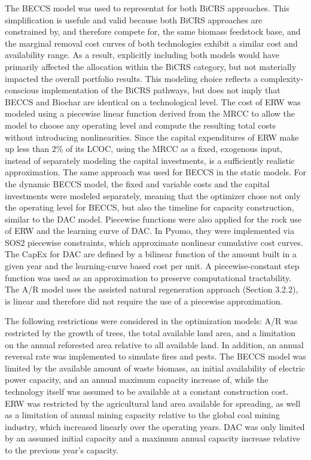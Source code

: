 The BECCS model was used to representat for both BiCRS approaches. This simplification is usefule and valid because both BiCRS approaches are constrained by, and therefore compete for, the same biomass feedstock base, and the marginal removal cost curves of both technologies exhibit a similar cost and availability range. As a result, explicitly including both models would have primarily affected the allocation within the BiCRS category, but not materially impacted the overall portfolio results. This modeling choice reflects a complexity-conscious implementation of the BiCRS pathways, but does not imply that BECCS and Biochar are identical on a technological level. The cost of ERW was modeled using a piecewise linear function derived from the MRCC to allow the model to choose any operating level and compute the resulting total costs without introducing nonlinearities. Since the capital expenditures of ERW make up less than 2\% of its LCOC, using the MRCC as a fixed, exogenous input, instead of separately modeling the capital investments, is a sufficiently realistic approximation. The same approach was used for BECCS in the static models. For the dynamic BECCS model, the fixed and variable costs and the capital investments were modeled separately, meaning that the optimizer chose not only the operating level for BECCS, but also the timeline for capacity construction, similar to the DAC model. Piecewise functions were also applied for the rock use of ERW and the learning curve of DAC. In Pyomo, they were implemented via SOS2 piecewise constraints, which approximate nonlinear cumulative cost curves. The CapEx for DAC are defined by a bilinear function of the amount built in a given year and the learning-curve based cost per unit. A piecewise-constant step function was used as an approximation to preserve computational tractability. The A/R model uses the assisted natural regeneration approach (Section 3.2.2), is linear and therefore did not require the use of a piecewise approximation. \vspace{2mm}

The following restrictions were considered in the optimization models: A/R was restricted by the growth of trees, the total available land area, and a limitation on the annual reforested area relative to all available land. In addition, an annual reversal rate was implemented to simulate fires and pests. The BECCS model was limited by the available amount of waste biomass, an initial availability of electric power capacity, and an annual maximum capacity increase of, while the technology itself was assumed to be available at a constant construction cost. ERW was restricted by the agricultural land area available for spreading, as well as a limitation of annual mining capacity relative to the global coal mining industry, which increased linearly over the operating years. DAC was only limited by an assumed initial capacity and a maximum annual capacity increase relative to the previous year's capacity.

